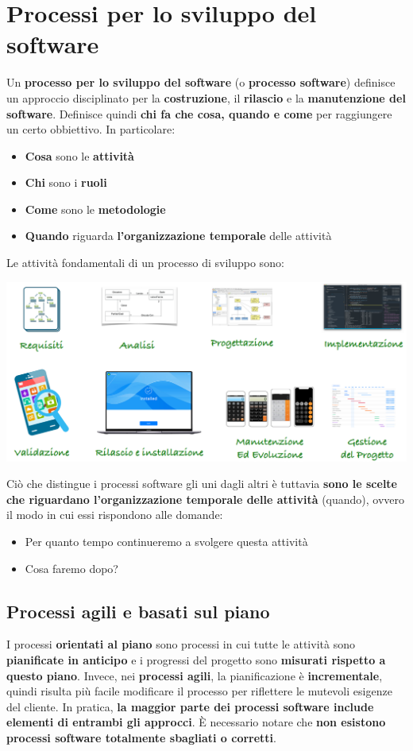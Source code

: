 \documentclass[12pt]{article}
\begin{document}
\section{Processi per lo sviluppo del software}
Un \textbf{processo per lo sviluppo del software} (o \textbf{processo software}) definisce un approccio disciplinato per la \textbf{costruzione}, il \textbf{rilascio} e la \textbf{manutenzione del software}.
Definisce quindi \textbf{chi fa che cosa, quando e come} per raggiungere un certo obbiettivo. In particolare:
\begin{itemize}
    \item \textbf{Cosa} sono le \textbf{attività}
    \item \textbf{Chi} sono i \textbf{ruoli}
    \item \textbf{Come} sono le \textbf{metodologie}
    \item \textbf{Quando} riguarda \textbf{l'organizzazione temporale} delle attività
\end{itemize} 
\newpage
\noindent
Le attività fondamentali di un processo di sviluppo sono:
\begin{center}
    \includegraphics[width = 1\textwidth]{Images/12.PNG}
\end{center}
Ciò che distingue i processi software gli uni dagli altri è tuttavia \textbf{sono le scelte che riguardano l'organizzazione temporale delle attività} (quando), ovvero il modo in cui essi rispondono alle domande:
\begin{itemize}
    \item Per quanto tempo continueremo a svolgere questa attività
    \item Cosa faremo dopo?
\end{itemize}
\subsection{Processi agili e basati sul piano}
I processi \textbf{orientati al piano} sono processi in cui tutte le attività sono \textbf{pianificate in anticipo} e i progressi del progetto sono \textbf{misurati rispetto a questo piano}.
Invece, nei \textbf{processi agili}, la pianificazione è \textbf{incrementale}, quindi risulta più facile modificare il processo per riflettere le mutevoli esigenze del cliente.
In pratica, \textbf{la maggior parte dei processi software include elementi di entrambi gli approcci}. È necessario notare che \textbf{non esistono processi software totalmente sbagliati o corretti}.
\end{document}
